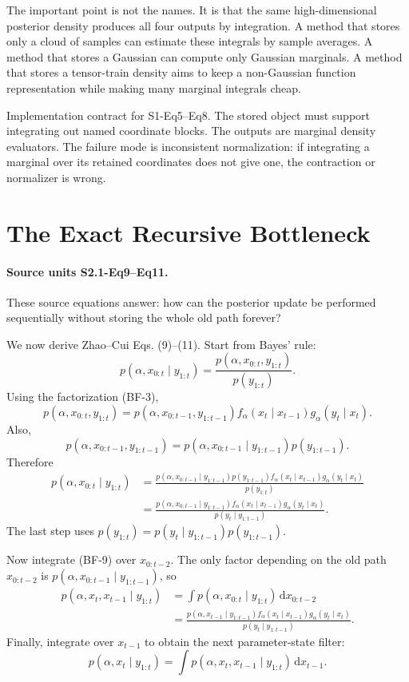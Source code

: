 \documentclass[11pt]{article}
\newcommand{\dd}{\,\mathrm d}
\begin{document}
The important point is not the names.  It is that the same high-dimensional
posterior density produces all four outputs by integration.  A method that
stores only a cloud of samples can estimate these integrals by sample averages.
A method that stores a Gaussian can compute only Gaussian marginals.  A method
that stores a tensor-train density aims to keep a non-Gaussian function
representation while making many marginal integrals cheap.

Implementation contract for S1-Eq5--Eq8.  The stored object must support
integrating out named coordinate blocks.  The outputs are marginal density
evaluators.  The failure mode is inconsistent normalization: if integrating a
marginal over its retained coordinates does not give one, the contraction or
normalizer is wrong.

\section{The Exact Recursive Bottleneck}

\paragraph{Source units S2.1-Eq9--Eq11.}
These source equations answer: how can the posterior update be performed
sequentially without storing the whole old path forever?

We now derive Zhao--Cui Eqs. (9)--(11).  Start from Bayes' rule:
\[
 p(\alpha,x_{0:t}\mid y_{1:t})
 =
 \frac{p(\alpha,x_{0:t},y_{1:t})}{p(y_{1:t})}.
\]
Using the factorization (BF-3),
\[
 p(\alpha,x_{0:t},y_{1:t})
 =
 p(\alpha,x_{0:t-1},y_{1:t-1})
 f_\alpha(x_t\mid x_{t-1})g_\alpha(y_t\mid x_t).
\]
Also,
\[
 p(\alpha,x_{0:t-1},y_{1:t-1})
 =
 p(\alpha,x_{0:t-1}\mid y_{1:t-1})p(y_{1:t-1}).
\]
Therefore
\[
\begin{aligned}
 p(\alpha,x_{0:t}\mid y_{1:t})
 &=
 \frac{
 p(\alpha,x_{0:t-1}\mid y_{1:t-1})p(y_{1:t-1})
 f_\alpha(x_t\mid x_{t-1})g_\alpha(y_t\mid x_t)}
 {p(y_{1:t})}\\
 &=
 \frac{
 p(\alpha,x_{0:t-1}\mid y_{1:t-1})
 f_\alpha(x_t\mid x_{t-1})g_\alpha(y_t\mid x_t)}
 {p(y_t\mid y_{1:t-1})}.
\end{aligned}
\tag{BF-9}
\]
The last step uses \(p(y_{1:t})=p(y_t\mid y_{1:t-1})p(y_{1:t-1})\).

Now integrate (BF-9) over \(x_{0:t-2}\).  The only factor depending on the old
path \(x_{0:t-2}\) is
\(p(\alpha,x_{0:t-1}\mid y_{1:t-1})\), so
\[
\begin{aligned}
 p(\alpha,x_t,x_{t-1}\mid y_{1:t})
 &=
 \int p(\alpha,x_{0:t}\mid y_{1:t})\dd x_{0:t-2}\\
 &=
 \frac{
 p(\alpha,x_{t-1}\mid y_{1:t-1})
 f_\alpha(x_t\mid x_{t-1})g_\alpha(y_t\mid x_t)}
 {p(y_t\mid y_{1:t-1})}.
\end{aligned}
\tag{BF-10}
\]
Finally, integrate over \(x_{t-1}\) to obtain the next parameter-state filter:
\[
    p(\alpha,x_t\mid y_{1:t})
    =
    \int p(\alpha,x_t,x_{t-1}\mid y_{1:t})\dd x_{t-1}.
    \tag{BF-11}
\]
\end{document}
